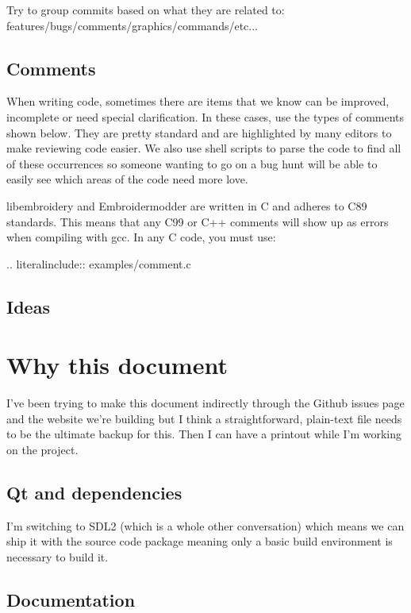 \documentclass[a4paper]{report}
\begin{document}
Try to group commits based on what they are related to:
features/bugs/comments/graphics/commands/etc...

\subsection{Comments}

When writing code, sometimes there are items that we know can be
improved, incomplete or need special clarification. In these cases, use
the types of comments shown below. They are pretty standard and are
highlighted by many editors to make reviewing code easier. We also use
shell scripts to parse the code to find all of these occurrences so
someone wanting to go on a bug hunt will be able to easily see which
areas of the code need more love.

libembroidery and Embroidermodder are written in C and adheres to C89 standards. This means
that any C99 or C++ comments will show up as errors when compiling with
gcc. In any C code, you must use:

.. literalinclude:: examples/comment.c

\subsection{Ideas}

\section{Why this document}

I've been trying to make this document indirectly through the Github
issues page and the website we're building but I think a
straightforward, plain-text file needs to be the ultimate backup for
this. Then I can have a printout while I'm working on the project.

\subsection{Qt and dependencies}

I'm switching to SDL2 (which is a whole other conversation) which means
we can ship it with the source code package meaning only a basic build
environment is necessary to build it.

\subsection{Documentation}
\end{document}
